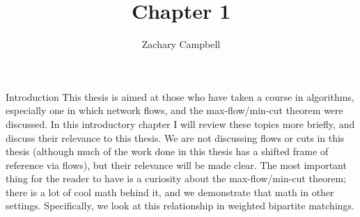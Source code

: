 \documentclass[11pt]{article}
\renewcommand{\'}{^{'}}
\begin{document}
\title{Chapter 1}
\author{Zachary Campbell}

\maketitle

\begin{section}{Introduction}
	This thesis is aimed at those who have taken a course in algorithms, especially one in which 
	network flows, and the max-flow/min-cut theorem were discussed. In this introductory chapter 
	I will review these topics more briefly, and discuss their relevance to this thesis. 
	We are not discussing flows or cuts in this thesis (although much of the work done in this 
	thesis has a shifted frame of reference via flows), but their relevance will be made clear. 
	The most important thing for the reader to have is a curiosity about the max-flow/min-cut 
	theorem; there is a lot of cool math behind it, and we demonstrate that math in other settings. 
	Specifically, we look at this relationship in weighted bipartite matchings.
\end{section}
\end{document}
